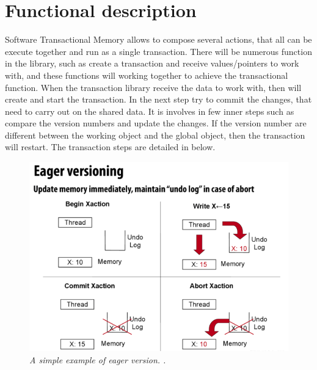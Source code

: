 \documentclass[12pt]{article}
\begin{document}
\section{Functional description}
Software Transactional Memory allows to compose several actions, that all can be execute together and run as a single transaction. There will be numerous function in the library, such as create a transaction and receive values/pointers to work with, and these functions will working together to achieve the transactional function. When the transaction library receive the data to work with, then will create and start the transaction. In the next step try to commit the changes, that need to carry out on the shared data. It is involves in few inner steps such as compare the version numbers and update the changes. If the version number are different between the working object and the global object, then the transaction will restart. The transaction steps are detailed in below.

\begin{figure}[h!]
\centering
\includegraphics[scale=0.4]{Pictures/eager.png}
\caption{\textit{\color{gray}A simple example of eager version. \cite{Xelblade}.}}
\end{figure}
\end{document}

